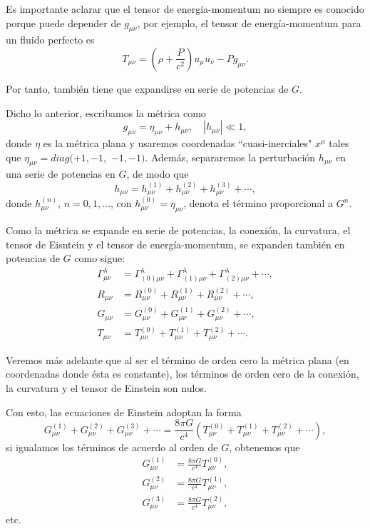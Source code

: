 \documentclass[letterpaper,11pt]{article}
\begin{document}
Es importante aclarar que el tensor de energía-momentum no siempre es conocido porque puede depender de $g_{\mu\nu}$, por ejemplo, el tensor de energía-momentum para un fluido perfecto es
\begin{equation}
T_{\mu\nu} = \left( \rho + \frac{P}{c^2}\right) u_{\mu} u_{\nu} - Pg_{\mu\nu}.
\end{equation}

Por tanto, también tiene que expandirse en serie de potencias de $G$.

Dicho lo anterior, escribamos la métrica como 
\begin{equation}
g_{\mu\nu} = \eta_{\mu\nu} + h_{\mu\nu}, \quad |h_{\mu\nu}| \ll 1,
\end{equation}
donde $\eta$ es la métrica plana y usaremos coordenadas ``cuasi-inerciales" $x^{\mu}$ tales que $\eta_{\mu\nu} = diag(+1,-1,$ $-1,-1)$. Además, separaremos la perturbación $h_{\mu\nu}$ en una serie de potencias en $G$, de modo que
\begin{equation}
h_{\mu\nu} = h^{(1)}_{\mu\nu} + h^{(2)}_{\mu\nu} + h^{(3)}_{\mu\nu} + \cdots,
\end{equation}
donde $h^{(n)}_{\mu\nu}$, $n = 0,1,\dots$, con $h^{(0)}_{\mu\nu} = \eta_{\mu\nu}$, denota el término proporcional a $G^n$.

Como la métrica se expande en serie de potencias, la conexión, la curvatura, el tensor de Eisntein y el tensor de energía-momentum, se expanden también en potencias de $G$ como sigue:
\begin{align}
\Gamma_{\mu\nu}^{\lambda} &= \Gamma_{(0)\mu\nu}^{\lambda} + \Gamma_{(1)\mu\nu}^{\lambda} + \Gamma_{(2)\mu\nu}^{\lambda} + \cdots, \label{eq:conexion} \\
R_{\mu\nu} &= R_{\mu\nu}^{(0)} + R_{\mu\nu}^{(1)} + R_{\mu\nu}^{(2)} + \cdots, \label{eq:Ricci} \\
G_{\mu\nu} &= G_{\mu\nu}^{(0)} + G_{\mu\nu}^{(1)} + G_{\mu\nu}^{(2)} + \cdots, \label{eq:Einstein-Tensor} \\
T_{\mu\nu} &= T_{\mu\nu}^{(0)} + T_{\mu\nu}^{(1)} + T_{\mu\nu}^{(2)} + \cdots. \label{eq:Energy-Momentum-Tensor}
\end{align}

Veremos más adelante que al ser el término de orden cero la métrica plana (en coordenadas donde ésta es constante), los términos de orden cero de la conexión, la curvatura y el tensor de Einstein son nulos.

Con esto, las ecuaciones de Einstein adoptan la forma
\begin{equation}
G_{\mu\nu}^{(1)} + G_{\mu\nu}^{(2)}  + G_{\mu\nu}^{(3)}  + \cdots = \frac{8\pi G}{c^4} \left( T_{\mu\nu}^{(0)} + T_{\mu\nu}^{(1)} + T_{\mu\nu}^{(2)} + \cdots   \right),
\end{equation}
si igualamos los términos de acuerdo al orden de $G$, obtenemos que
\begin{align}
G_{\mu\nu}^{(1)} &= \frac{8\pi G}{c^4} T_{\mu\nu}^{(0)}, \label{eq:Einstein-First-Order} \\
G_{\mu\nu}^{(2)} &= \frac{8\pi G}{c^4} T_{\mu\nu}^{(1)}, \\
G_{\mu\nu}^{(3)} &= \frac{8\pi G}{c^4} T_{\mu\nu}^{(2)},
\end{align}
etc.
\end{document}
